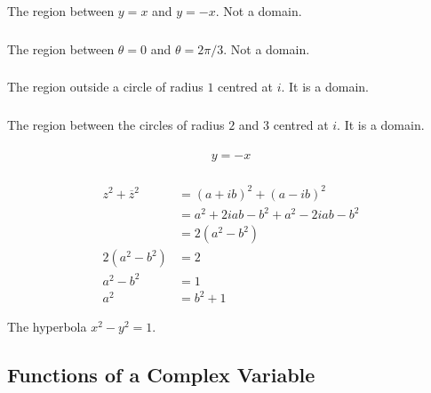 \documentclass{article}
\begin{document}
The region between $y = x$ and $y = -x$. Not a domain.

\setcounter{subsubsection}{16}
\subsubsection{}

The region between $\theta = 0$ and $\theta = 2 \pi / 3$. Not a domain.

\setcounter{subsubsection}{18}
\subsubsection{}

The region outside a circle of radius $1$ centred at $i$. It is a domain.

\setcounter{subsubsection}{20}
\subsubsection{}

The region between the circles of radius $2$ and $3$ centred at $i$. It is a domain.

\setcounter{subsubsection}{22}
\subsubsection{}

\[y = -x\]

\setcounter{subsubsection}{24}
\subsubsection{}

\begin{align*}
  z^2 + \overline{z}^2 & = (a + i b)^2 + (a - i b)^2                 \\
                       & = a^2 + 2 i a b - b^2 + a^2 - 2 i a b - b^2 \\
                       & = 2 (a^2 - b^2)                             \\
  2 (a^2 - b^2)        & = 2                                         \\
  a^2 - b^2            & = 1                                         \\
  a^2                  & = b^2 + 1
\end{align*}

The hyperbola $x^2 - y^2 = 1$.

\subsection{Functions of a Complex Variable}
\end{document}
